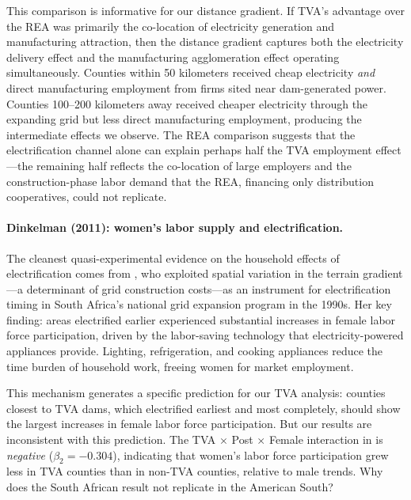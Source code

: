 \documentclass[12pt]{article}
\begin{document}
This comparison is informative for our distance gradient. If TVA's advantage over the REA was primarily the co-location of electricity generation and manufacturing attraction, then the distance gradient captures both the electricity delivery effect and the manufacturing agglomeration effect operating simultaneously. Counties within 50 kilometers received cheap electricity \textit{and} direct manufacturing employment from firms sited near dam-generated power. Counties 100--200 kilometers away received cheaper electricity through the expanding grid but less direct manufacturing employment, producing the intermediate effects we observe. The \citeauthor{kitchens2015} REA comparison suggests that the electrification channel alone can explain perhaps half the TVA employment effect---the remaining half reflects the co-location of large employers and the construction-phase labor demand that the REA, financing only distribution cooperatives, could not replicate.

\paragraph{Dinkelman (2011): women's labor supply and electrification.} The cleanest quasi-experimental evidence on the household effects of electrification comes from \citet{dinkelman2011}, who exploited spatial variation in the terrain gradient---a determinant of grid construction costs---as an instrument for electrification timing in South Africa's national grid expansion program in the 1990s. Her key finding: areas electrified earlier experienced substantial increases in female labor force participation, driven by the labor-saving technology that electricity-powered appliances provide. Lighting, refrigeration, and cooking appliances reduce the time burden of household work, freeing women for market employment.

This mechanism generates a specific prediction for our TVA analysis: counties closest to TVA dams, which electrified earliest and most completely, should show the largest increases in female labor force participation. But our results are inconsistent with this prediction. The TVA $\times$ Post $\times$ Female interaction in  is \textit{negative} ($\beta_2 = -0.304$), indicating that women's labor force participation grew less in TVA counties than in non-TVA counties, relative to male trends. Why does the South African result not replicate in the American South?
\end{document}
